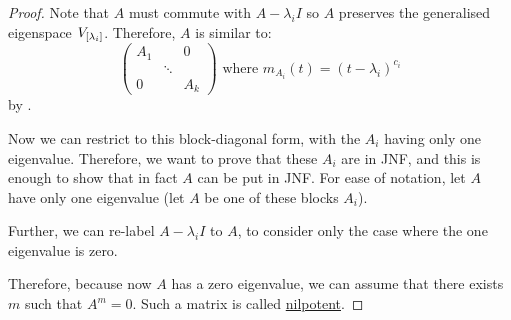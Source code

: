 \documentclass[../Main.tex]{subfiles}
\begin{document}
\begin{proof}
    Note that $A$ must commute with $A - \lambda_i I$ so $A$ preserves the generalised eigenspace ${V}_{[\lambda_i]}$. Therefore, $A$ is similar to:
    \begin{equation*}
        \begin{pmatrix}
            A_1 &  & 0 \\
             & \ddots &  \\
            0 &  & A_k
        \end{pmatrix}
        \text{ where } m_{A_i}(t) = (t - \lambda_i)^{c_i}
    \end{equation*}
    by .

    Now we can restrict to this block-diagonal form, with the $A_i$ having only one eigenvalue. Therefore, we want to prove that these $A_i$ are in JNF, and this is enough to show that in fact $A$ can be put in JNF. For ease of notation, let $A$ have only one eigenvalue (let $A$ be one of these blocks $A_i$).

    Further, we can re-label $A - \lambda_i I$ to $A$, to consider only the case where the one eigenvalue is zero.

    Therefore, because now $A$ has a zero eigenvalue, we can assume that there exists $m$ such that $A^m = 0$. Such a matrix is called \underline{nilpotent}.


\end{proof}
\end{document}
